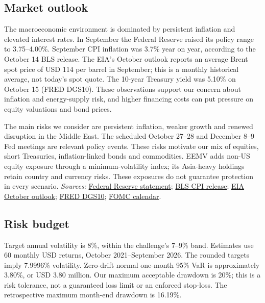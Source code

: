 \documentclass[10pt,a4paper]{article}
\begin{document}
\subsection{Market outlook}
The macroeconomic environment is dominated by persistent inflation and elevated interest rates. In September the Federal Reserve raised its policy range to 3.75--4.00\%. September CPI inflation was 3.7\% year on year, according to the October 14 BLS release. The EIA's October outlook reports an average Brent spot price of USD 114 per barrel in September; this is a monthly historical average, not today's spot quote. The 10-year Treasury yield was 5.10\% on October 15 (FRED DGS10). These observations support our concern about inflation and energy-supply risk, and higher financing costs can put pressure on equity valuations and bond prices.

The main risks we consider are persistent inflation, weaker growth and renewed disruption in the Middle East. The scheduled October 27--28 and December 8--9 Fed meetings are relevant policy events. These risks motivate our mix of equities, short Treasuries, inflation-linked bonds and commodities. EEMV adds non-US equity exposure through a minimum-volatility index; its Asia-heavy holdings retain country and currency risks. These exposures do not guarantee protection in every scenario. {\footnotesize\textit{Sources:} \href{https://www.federalreserve.gov/newsevents/pressreleases/monetary20260916a.htm}{Federal Reserve statement}; \href{https://www.bls.gov/news.release/archives/cpi_10142026.htm}{BLS CPI release}; \href{https://www.eia.gov/outlooks/steo/archives/oct26.pdf}{EIA October outlook}; \href{https://fred.stlouisfed.org/series/DGS10}{FRED DGS10}; \href{https://www.federalreserve.gov/monetarypolicy/fomccalendars.htm}{FOMC calendar}.}

\subsection{Risk budget}
Target annual volatility is 8\%, within the challenge's 7--9\% band. Estimates use 60 monthly USD returns, October 2021--September 2026. The rounded targets imply 7.9996\% volatility. Zero-drift normal one-month 95\% VaR is approximately 3.80\%, or USD 3.80 million. Our maximum acceptable drawdown is 20\%; this is a risk tolerance, not a guaranteed loss limit or an enforced stop-loss. The retrospective maximum month-end drawdown is 16.19\%.
\end{document}
